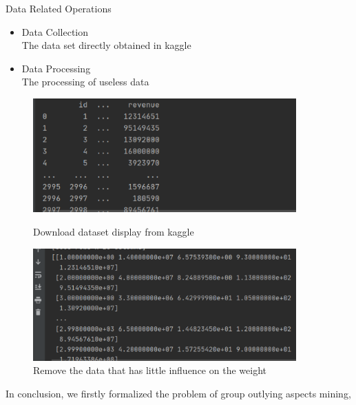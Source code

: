 \documentclass[
 size=14pt,
 paper=smartboard,  %
 mode=present, 		%
 display=slides, 	%
 style=tuliplab,  	%
 pauseslide,
 fleqn,leqno]{powerdot}
\begin{document}




\begin{slide}[toc=,bm=]{ Data Related Operations}
\begin{itemize}
\item Data Collection
\\The data set directly obtained in kaggle    
\item 
Data Processing
\\The processing of useless data

\end{itemize}
\begin{figure}[htbp]
  \centering
  \begin{minipage}[t]{0.48\textwidth}
    \centering
    \includegraphics[width=0.9\textwidth]{logos/4.eps}
    \vspace{-1.4em}
    \caption{Download dataset display from kaggle}
  \end{minipage}
  \begin{minipage}[t]{0.48\textwidth}
    \centering
    \includegraphics[width=0.9\textwidth]{logos/5.eps}
    \vspace{-1.4em}
    \caption{Remove the data that has little influence on the weight}
  \end{minipage}
\end{figure}
\begin{note}
In conclusion,
we firstly formalized the problem of
group outlying aspects mining,


\end{note}
\end{slide}
\end{document}
